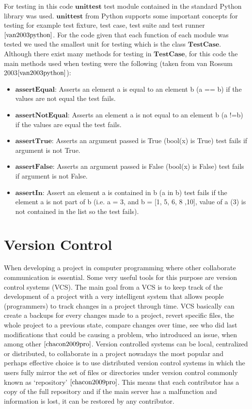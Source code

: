 For testing in this code $\textbf{unittest}$ test module contained in the standard Python library was used. $\textbf{unittest}$ from Python supports some important concepts for testing for example test fixture, test case, test suite and test runner $\cite{van2003python}$. For the code given that each function of each module was tested we used the smallest unit for testing which is the class $\textbf{TestCase}$. Although there exist many methods for testing in $\textbf{TestCase}$,  for this code the main methods used when testing were the following (taken from van Rossum 2003$\cite{van2003python}$):

\begin{itemize}
	\item $\textbf{assertEqual:}$ Asserts an element a is equal to an element  b (a == b) if the values are not equal the test fails.
	\item $\textbf{assertNotEqual:}$ Asserts an element a is not equal to an element b (a !=b) if the values are equal the test fails.
	\item $\textbf{assertTrue:}$ Asserts an argument passed is True (bool(x) is True) test fails if argument is not True. 
	\item $\textbf{assertFalse:}$ Asserts an argument passed is False (bool(x) is False) test fails if argument is not False.
	\item $\textbf{assertIn:}$ Assert an element a is contained in b (a in b) test fails if the element a is not part of b (i.e. a = 3, and b = [1, 5, 6, 8 ,10], value of a (3) is not contained in the list so the test fails).
\end{itemize}

\section{Version Control}
When developing a project in computer programming where other collaborate communication is essential. Some very useful tools for this purpose are version control systems (VCS). The main goal from a VCS is to keep track of the development of a project with a very intelligent system that allows people (programmers) to track changes in a project through time. VCS basically can create a backups for every changes made to a project, revert specific files, the whole project to a previous state, compare changes over time, see who did last modifications that could be causing a problem, who introduced an issue, when among other $\cite{chacon2009pro}$. Version controlled systems can be local, centralized or distributed, to collaborate in a project nowadays the most popular and perhaps effective choice is to use distributed version control systems in which the users fully mirror the set of files or directories under version control commonly known as `repository' $\cite{chacon2009pro}$. This means that each contributor has a copy of the full repository and if the main server has a malfunction and information is lost, it can be restored by any contributor. 

